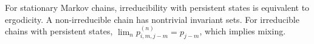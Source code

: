 For stationary Markov chains, irreducibility with persistent states is equivalent to ergodicity. A non-irreducible chain has nontrivial invariant sets. For irreducible chains with persistent states, $\lim_n p_{i,m,j-m}^{(n)} = p_{j-m}$, which implies mixing.
